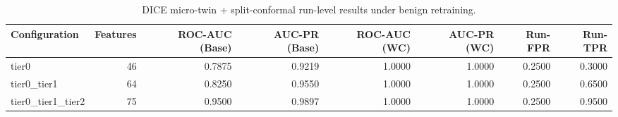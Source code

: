 \begin{table}[t]
\centering
\caption{DICE micro-twin + split-conformal run-level results under benign retraining.}
\label{tab:dice_full_overall}
\footnotesize
\begin{tabular}{lrrrrrrr}
\toprule
Configuration & Features & ROC-AUC (Base) & AUC-PR (Base) & ROC-AUC (WC) & AUC-PR (WC) & Run-FPR & Run-TPR \\
\midrule
tier0 & 46 & 0.7875 & 0.9219 & 1.0000 & 1.0000 & 0.2500 & 0.3000 \\
tier0_tier1 & 64 & 0.8250 & 0.9550 & 1.0000 & 1.0000 & 0.2500 & 0.6500 \\
tier0_tier1_tier2 & 75 & 0.9500 & 0.9897 & 1.0000 & 1.0000 & 0.2500 & 0.9500 \\
\bottomrule
\end{tabular}

\end{table}

